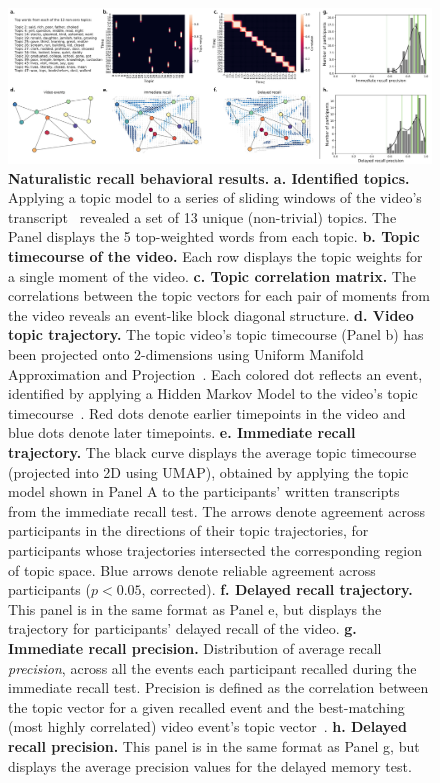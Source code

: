 \documentclass[10pt]{article}
\begin{document}
\begin{figure}
\centering
\includegraphics[width=1\textwidth]{figs/naturalistic_recall_behavior}
\caption{\textbf{Naturalistic recall behavioral results.}
  \textbf{a. Identified topics.}  Applying a topic model to a series
  of sliding windows of the video's transcript~\citep{HeusEtal21}
  revealed a set of 13 unique (non-trivial) topics.  The Panel
  displays the 5 top-weighted words from each topic.  \textbf{b. Topic
  timecourse of the video.}  Each row displays the topic weights for a
single moment of the video.  \textbf{c. Topic correlation matrix.}  The
correlations between the topic vectors for each pair of moments from
the video reveals an event-like block diagonal structure.
\textbf{d. Video topic trajectory.}  The topic video's topic
timecourse (Panel b) has been projected onto 2-dimensions using
Uniform Manifold Approximation and
Projection~\citep[UMAP;][]{McInEtal18}.  Each colored dot reflects an
event, identified by applying a Hidden Markov Model to the video's
topic timecourse~\citep{BaldEtal17, HeusEtal21}.  Red dots denote
earlier timepoints in the video and blue dots denote later
timepoints.  \textbf{e. Immediate recall trajectory.}  The black curve
displays the average
topic timecourse (projected into 2D using UMAP), obtained by applying the topic model shown in Panel A
to the participants' written transcripts from the immediate recall
test.  The arrows denote agreement across participants in the
directions of their topic trajectories, for participants whose
trajectories intersected the corresponding region of topic space.
Blue arrows denote reliable agreement across participants ($p < 0.05$, corrected).
\textbf{f. Delayed recall trajectory.} This panel is in the same
format as Panel e, but displays the trajectory for participants'
delayed recall of the video.  \textbf{g. Immediate recall precision.}  Distribution of
average recall \textit{precision}, across all the events each
participant recalled during the immediate recall test.  Precision is
defined as the correlation between the topic vector for a given
recalled event and the best-matching (most highly correlated) video
event's topic
vector~\citep{HeusEtal21}.  \textbf{h. Delayed recall precision.}
This panel is in the same format as Panel g, but displays the average
precision values for the delayed memory test.}
\label{fig:nat_behavioral}
\end{figure}
\end{document}
